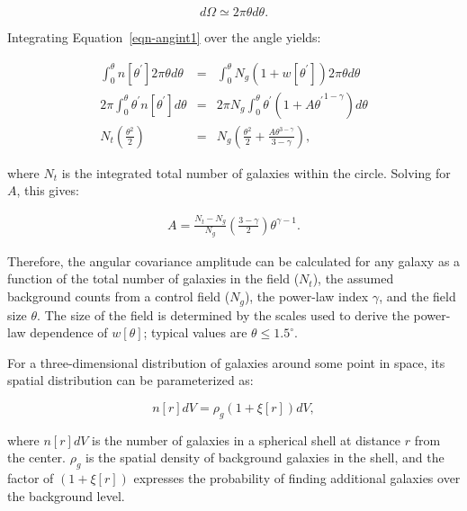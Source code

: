 \documentclass{emulateapj}
\begin{document}
\begin{equation}
d\Omega \simeq 2\pi \theta d\theta.
\end{equation}

\noindent Integrating Equation~\ref{eqn-angint1} over the angle yields:

\begin{eqnarray}
\int^\theta_0 n[\theta^\prime] 2 \pi \theta d\theta & = & \int^\theta_0 N_g (1 + w[\theta^\prime]) 2 \pi \theta d\theta \\
2\pi \int^\theta_0 \theta^\prime n[\theta^\prime]d\theta & = & 2 \pi N_g \int^\theta_0 \theta^\prime (1 + A {\theta^\prime}^{1-\gamma}) d\theta \\
N_t \left(\frac{\theta^2}{2}\right) & = & N_g \left(\frac{\theta^2}{2} + \frac{A\theta^{3-\gamma}}{3-\gamma}\right),
\end{eqnarray}

\noindent where $N_t$ is the integrated total number of galaxies within the circle. Solving for $A$, this gives:

\begin{eqnarray}
A = \frac{N_t - N_g}{N_g} \left(\frac{3-\gamma}{2}\right) \theta^{\gamma-1}.
\end{eqnarray}

Therefore, the angular covariance amplitude can be calculated for any galaxy as a function of the total number of galaxies in the field ($N_t$), the assumed background counts from a control field ($N_g$), the power-law index $\gamma$, and the field size $\theta$. The size of the field is determined by the scales used to derive the power-law dependence of $w[\theta]$; typical values are $\theta\leq1.5^\circ$. 


For a three-dimensional distribution of galaxies around some point in space, its spatial distribution can be parameterized as:

\begin{equation}
n[r]dV = \rho_g (1 + \xi[r]) dV,
\end{equation}

\noindent where $n[r]dV$ is the number of galaxies in a spherical shell at distance $r$ from the center. $\rho_g$ is the spatial density of background galaxies in the shell, and the factor of $(1+\xi[r])$ expresses the probability of finding additional galaxies over the background level. 
\end{document}
